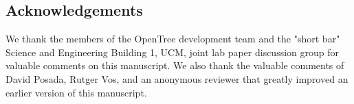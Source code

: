 \documentclass{bmcart}
\begin{document}
\begin{backmatter}
\section*{Acknowledgements}
We thank the members of the OpenTree development team and the "short bar" Science
and Engineering Building 1, UCM, joint lab paper discussion group for valuable
comments on this manuscript. We also thank the valuable comments of David Posada, Rutger Vos,
and an anonymous reviewer that greatly improved an earlier version of this manuscript.








\end{backmatter}
\end{document}
